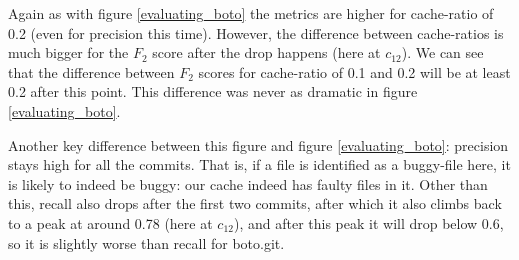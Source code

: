 \documentclass[12pt,twoside,notitlepage]{report}
\begin{document}
Again as with figure \ref{evaluating_boto} the metrics are higher for cache-ratio of 0.2 (even for precision this time). However, the difference between cache-ratios is much bigger for the $F_2$ score after the drop happens (here at $c_{12}$). We can see that the difference between $F_2$ scores for cache-ratio of 0.1 and 0.2 will be at least 0.2 after this point. This difference was never as dramatic in figure \ref{evaluating_boto}.

Another key difference between this figure and figure \ref{evaluating_boto}: precision stays high for all the commits. That is, if a file is identified as a buggy-file here, it is likely to indeed be buggy: our cache indeed has faulty files in it. Other than this, recall also drops after the first two commits, after which it also climbs back to a peak at around 0.78 (here at $c_{12}$), and after this peak it will drop below 0.6, so it is slightly worse than recall for boto.git.

\end{document}
